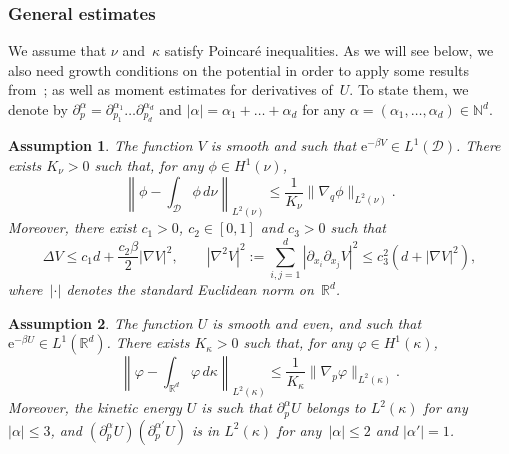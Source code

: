 \documentclass{article}
\newtheorem{assumption}{Assumption}
\newcommand{\rme}{\mathrm{e}}
\newcommand{\cD}{\mathcal{D}}
\newcommand{\R}{\mathbb{R}}
\renewcommand{\leq}{\leqslant}
\begin{document}
\subsubsection{General estimates}
\label{eq:general_estimates_Langevin}

We assume that $\nu$ and~$\kappa$ satisfy Poincar\'e inequalities. As we will see below, we also need growth conditions on the potential in order to apply some results from~\cite{DMS15}; as well as moment estimates for derivatives of~$U$. To state them, we denote by $\partial_p^\alpha = \partial_{p_1}^{\alpha_1} \dots \partial_{p_d}^{\alpha_d}$ and $|\alpha| = \alpha_1 + \dots + \alpha_d$ for any $\alpha = (\alpha_1,\dots,\alpha_d) \in \mathbb{N}^d$.

\begin{assumption}
  \label{ass:Poincare_nu}
  The function $V$ is smooth and such that $\rme^{-\beta V} \in L^1(\cD)$. There exists $K_\nu > 0$ such that, for any $\phi \in H^1(\nu)$,  
  \[
    \left\| \phi - \int_{\mathcal{D}} \phi \, d\nu \right\|_{L^2(\nu)} \leq \frac{1}{K_\nu} \| \nabla_q \phi  \|_{L^2(\nu)}.
  \]
  Moreover, there exist $c_1 > 0$, $c_2 \in [0,1]$ and $c_3 > 0$ such that
  \begin{equation}
    \label{eq:regularization condition}
    \Delta V \leq c_1 d + \frac {c_2 \beta} 2 | \nabla V |^2, \qquad \left|\nabla^2 V \right|^2 := \sum_{i,j=1}^d \left|\partial_{x_i}\partial_{x_j}V\right|^2 \leq c_3^2 \left( d + | \nabla V |^2 \right),
  \end{equation}
  where~$|\cdot|$ denotes the standard Euclidean norm on~$\R^d$.
\end{assumption}

\begin{assumption}
  \label{ass:Poincare_kappa}
  The function $U$ is smooth and even, and such that $\rme^{-\beta U} \in L^1(\R^d)$. There exists $K_\kappa > 0$ such that, for any $\varphi \in H^1(\kappa)$,  
  \[
    \left\| \varphi - \int_{\R^d} \varphi \, d\kappa \right\|_{L^2(\kappa)} \leq \frac{1}{K_\kappa} \| \nabla_p \varphi  \|_{L^2(\kappa)}.
  \]
  Moreover, the kinetic energy $U$ is such that $\partial_p^\alpha U$ belongs to $L^2(\kappa)$ for any $|\alpha| \leq 3$, and $(\partial_p^{\alpha} U) (\partial_p^{\alpha'} U)$ is in $L^2(\kappa)$ for any~$|\alpha| \leq 2$ and $|\alpha'| = 1$.
\end{assumption}
\end{document}
